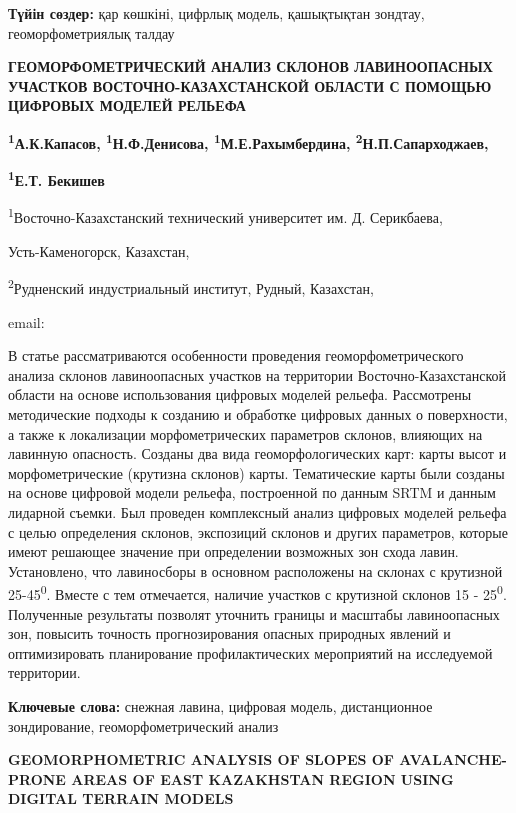 {\bfseries Түйін сөздер:} қар көшкіні, цифрлық модель, қашықтықтан зондтау,
геоморфометриялық талдау

{\bfseries ГЕОМОРФОМЕТРИЧЕСКИЙ АНАЛИЗ СКЛОНОВ ЛАВИНООПАСНЫХ УЧАСТКОВ
ВОСТОЧНО-КАЗАХСТАНСКОЙ ОБЛАСТИ С ПОМОЩЬЮ ЦИФРОВЫХ МОДЕЛЕЙ РЕЛЬЕФА}

{\bfseries \textsuperscript{1}А.К.Капасов, \textsuperscript{1}Н.Ф.Денисова,
\textsuperscript{1}М.Е.Рахымбердина\textsuperscript{\envelope },
\textsuperscript{2}Н.П.Сапарходжаев,}

{\bfseries \textsuperscript{1}Е.Т. Бекишев}

\textsuperscript{1}Восточно-Казахстанский технический университет им. Д.
Серикбаева,

Усть-Каменогорск, Казахстан,

\textsuperscript{2}Рудненский индустриальный институт, Рудный,
Казахстан,

email:
\href{mailto:MRahymberdina@edu.ektu.kz}{}

В статье рассматриваются особенности проведения геоморфометрического
анализа склонов лавиноопасных участков на территории
Восточно-Казахстанской области на основе использования цифровых моделей
рельефа. Рассмотрены методические подходы к созданию и обработке
цифровых данных о поверхности, а также к локализации морфометрических
параметров склонов, влияющих на лавинную опасность. Созданы два вида
геоморфологических карт: карты высот и морфометрические (крутизна
склонов) карты. Тематические карты были созданы на основе цифровой
модели рельефа, построенной по данным SRTM и данным лидарной съемки. Был
проведен комплексный анализ цифровых моделей рельефа с целью определения
склонов, экспозиций склонов и других параметров, которые имеют решающее
значение при определении возможных зон схода лавин. Установлено, что
лавиносборы в основном расположены на склонах с крутизной
25-45\textsuperscript{0}. Вместе с тем отмечается, наличие участков с
крутизной склонов 15 - 25\textsuperscript{0}. Полученные результаты
позволят уточнить границы и масштабы лавиноопасных зон, повысить
точность прогнозирования опасных природных явлений и оптимизировать
планирование профилактических мероприятий на исследуемой территории.

{\bfseries Ключевые слова:} снежная лавина, цифровая модель, дистанционное
зондирование, геоморфометрический анализ

{\bfseries GEOMORPHOMETRIC ANALYSIS OF SLOPES OF AVALANCHE-PRONE AREAS OF
EAST KAZAKHSTAN REGION USING DIGITAL TERRAIN MODELS}

